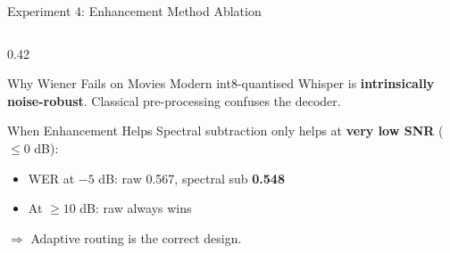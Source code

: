\documentclass[aspectratio=169]{beamer}
\begin{document}
\begin{frame}{Experiment 4: Enhancement Method Ablation}
\begin{columns}[T]
\begin{column}{0.42\textwidth}
\begin{block}{Why Wiener Fails on Movies}
        Modern int8-quantised Whisper is \textbf{intrinsically noise-robust}. Classical pre-processing confuses the decoder.
      \end{block}
      \begin{block}{When Enhancement Helps}
        Spectral subtraction only helps at \textbf{very low SNR} ($\leq 0$ dB):
        \begin{itemize}
          \item WER at $-5$ dB: raw 0.567, spectral sub \textbf{0.548}
          \item At $\geq 10$ dB: raw always wins
        \end{itemize}
        $\Rightarrow$ Adaptive routing is the correct design.
      \end{block}
    \end{column}
  \end{columns}
\end{frame}
\end{document}
